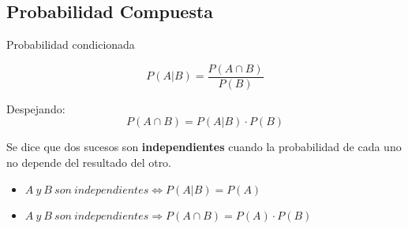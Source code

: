 \documentclass[11pt,handout]{beamer}
\begin{document}
\subsection{Probabilidad Compuesta}
\begin{frame}{Probabilidad condicionada}
\begin{block}{}
$$P(A|B)=\dfrac{P(A\cap B)}{P(B)}$$
\end{block}

\pause
Despejando:
$$P(A\cap B) = P(A|B)\cdot P(B)$$

\pause

Se dice que dos sucesos son \textbf{independientes} cuando la probabilidad de cada uno no depende del resultado del otro. 




\begin{itemize}[<+->]

\item $A\ y \ B\ son \ independientes \Longleftrightarrow P(A|B)=P(A)$

\item $A\ y \ B\ son \ independientes \Rightarrow P(A \cap B)=P(A) \cdot P(B)$

\end{itemize}


\end{frame}
\end{document}
